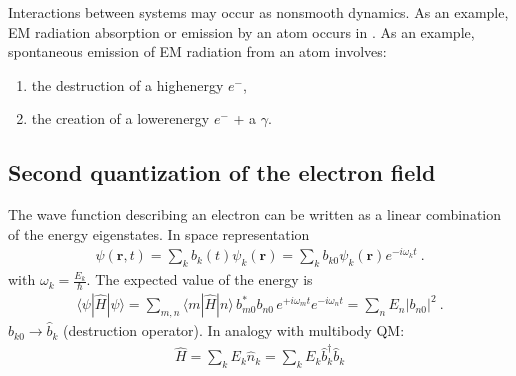 \documentclass[letterpaper,10pt,english]{jupyterBook}
\begin{document}
\sphinxAtStartPar
{} Interactions between systems may occur as non\sphinxhyphen{}smooth dynamics. As an example, EM radiation absorption or emission by an atom occurs in . As an example, spontaneous emission of EM radiation from an atom involves:
\begin{enumerate}
%
\item {} 
\sphinxAtStartPar
the destruction of a high\sphinxhyphen{}energy \(e^-\),

\item {} 
\sphinxAtStartPar
the creation of a lower\sphinxhyphen{}energy \(e^-\) + a \(\gamma\).

\end{enumerate}


\subsection{Second quantization of the electron field}
\label{\detokenize{ch/quantum-mechanics/qft/multi-body:second-quantization-of-the-electron-field}}
\sphinxAtStartPar
{} The wave function describing an electron can be written as a linear combination of the energy eigenstates. In space representation
\begin{equation*}
\begin{split}
\psi(\mathbf{r},t)=\sum_k b_k(t)\psi_k(\mathbf{r}) = \sum_k b_{k0} \psi_k(\mathbf{r}) e^{-i\omega_kt} \ .
\end{split}
\end{equation*}
\sphinxAtStartPar
with \(\omega_k = \tfrac{E_k}{\hbar}\). The expected value of the energy is
\begin{equation*}
\begin{split}
\langle\psi|\hat H|\psi\rangle=\sum_{m,n}\langle m|\hat H|n\rangle\,b^*_{m0}b_{n0}\,e^{+i\omega_mt}e^{-i\omega_nt}
=\sum_nE_n|b_{n0}|^2 \ .
\end{split}
\end{equation*}
\sphinxAtStartPar
{} \(b_{k0}\to\hat b_k\) (destruction operator). In analogy with multi\sphinxhyphen{}body QM:
\begin{equation*}
\begin{split}
\hat H=\sum_kE_k\hat n_k=\sum_kE_k\hat b_k^\dagger\hat b_k
\end{split}
\end{equation*}
\end{document}
